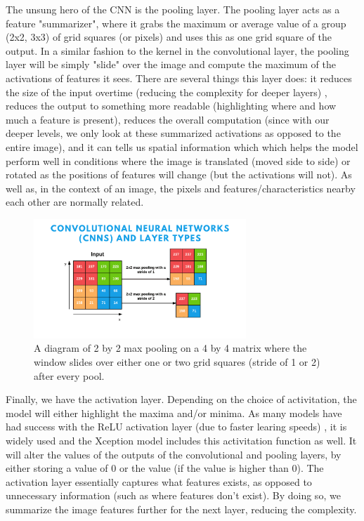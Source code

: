 \documentclass[10pt,twocolumn]{article}
\begin{document}
The unsung hero of the CNN is the pooling layer. The pooling layer acts as a feature "summarizer", where it grabs the maximum or average value of a group (2x2, 3x3) of grid squares (or pixels) and uses this as one grid square of the output. In a similar fashion to the kernel in the convolutional layer, the pooling layer will be simply "slide" over the image and compute the maximum of the activations of features it sees. There are several things this layer does: it reduces the size of the input overtime (reducing the complexity for deeper layers) \cite{Albawi2017}, reduces the output to something more readable (highlighting where and how much a feature is present), reduces the overall computation (since with our deeper levels, we only look at these summarized activations as opposed to the entire image), and it can tells us spatial information which which helps the model perform well in conditions where the image is translated (moved side to side) or rotated as the positions of features will change (but the activations will not). As well as, in the context of an image, the pixels and features/characteristics nearby each other are normally related.

\begin{figure}[h]
  \includegraphics[width=8cm]{max_pooling.png}
  \caption{A diagram of 2 by 2 max pooling on a 4 by 4 matrix where the window slides over either one or two grid squares (stride of 1 or 2) after every pool.}
  \centering
\end{figure}

Finally, we have the activation layer. Depending on the choice of activitation, the model will either highlight the maxima and/or minima. As many models have had success with the ReLU activation layer (due to faster learing speeds) \cite{Ide2017}, it is widely used and the Xception model includes this activitation function as well. It will alter the values of the outputs of the convolutional and pooling layers, by either storing a value of 0 or the value (if the value is higher than 0). The activation layer essentially captures what features exists, as opposed to unnecessary information (such as where features don't exist). By doing so, we summarize the image features further for the next layer, reducing the complexity.
\end{document}
